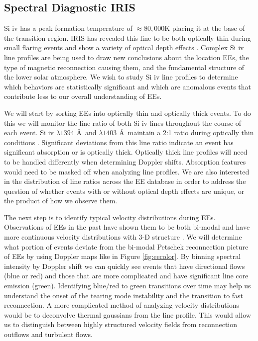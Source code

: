 \documentclass[]{aastex6}
\begin{document}

	
	\subsection{Spectral Diagnostic IRIS}
	Si {\sc iv} has a peak formation temperature of $\approx 80,000$K placing it at the base of the transition region.  IRIS has revealed this line to be both optically thin during small flaring events and show a variety of optical depth effects \citep{Peter2014,Yan2015}.  Complex Si {\sc iv} line profiles are being used to draw new conclusions about the location EEs, the type of magnetic reconnection causing them, and the fundamental structure of the lower solar atmosphere.  We wish to study Si {\sc iv} line profiles to determine which behaviors are statistically significant and which are anomalous events that contribute less to our overall understanding of EEs.
	
	We will start by sorting EEs into optically thin and optically thick events. To do this we will monitor the line ratio of both Si {\sc iv} lines throughout the course of each event.  Si {\sc iv} $\lambda 1394$ \AA \ and $\lambda 1403$ \AA \  maintain a 2:1 ratio during optically thin conditions  \citep{Mathioudakis1999}.  Significant deviations from this line ratio indicate an event has significant absorption or is optically thick.  Optically thick line profiles will need to be handled differently when determining Doppler shifts.  Absorption features would need to be masked off when analyzing line profiles. We are also interested in the distribution of line ratios across the EE database in order to address the question of whether events with or without optical depth effects are unique, or the product of how we observe them.
	
	
	The next step is to identify typical velocity distributions during EEs.  Observations of EEs in the past have shown them to be both bi-modal \citep{Innes1997,Rust2017} and have more continuous velocity distributions with 3-D structure \citep{Fox2010,Innes2015,Rouppe2017}.  We will determine what portion of events deviate from the bi-modal Petschek reconnection picture of EEs by using Doppler maps like in Figure \ref{fig:eecolor}. By binning spectral intensity by Doppler shift we can quickly see events that have directional flows (blue or red) and those that are more complicated and have significant line core emission (green).  Identifying blue/red to green transitions over time may help us understand the onset of the tearing mode instability and the transition to fast reconnection.  A more complicated method of analyzing velocity distributions would be to deconvolve thermal gaussians from the line profile.  This would allow us to distinguish between highly structured velocity fields from reconnection outflows and turbulent flows.
	
\end{document}
